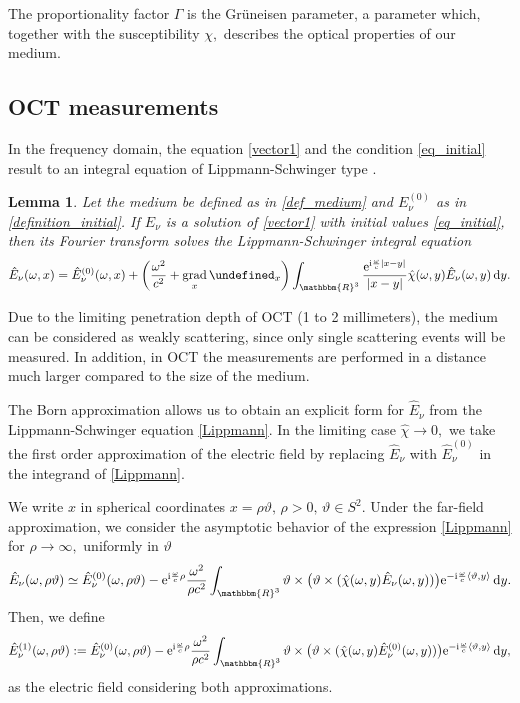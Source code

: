\documentclass[a4paper,twoside,10pt]{article}
\theoremstyle{break}
\newtheorem{lemma}{Lemma}[section]
\theoremstyle{nonumberplain}
\newcommand{\R}{\mathbbm{R}}
\newcommand{\e}{\mathrm e}
\renewcommand{\i}{\mathrm i}
\renewcommand{\d}{\,\mathrm d}
\let\div=\undefined
\DeclareMathOperator{\div}{div}
\DeclareMathOperator{\grad}{grad}
\begin{document}
The proportionality factor $\Gamma$ is the Gr\"uneisen parameter, a parameter which, together with the susceptibility $\chi,$ describes the optical properties of our medium.

\subsection{OCT measurements}

 In the frequency domain, the equation \eqref{vector1} and the condition \eqref{eq_initial} result to an integral equation of Lippmann-Schwinger type \cite{ColKre98, ElbMinSch15}. 

\begin{lemma}
Let the medium be defined as in \autoref{def_medium} and $E_\nu^{(0)}$  as in \autoref{definition_initial}. If $E_\nu$ is a solution of \eqref{vector1} with initial values \eqref{eq_initial}, then its Fourier transform solves the Lippmann-Schwinger integral equation
\begin{equation}\label{Lippmann}
\hat E_\nu (\omega ,x) = \hat E_\nu^{(0)}(\omega,x) + \left(\frac{\omega^2}{c^2}+\grad_x\div_x\right)\int_{\R^3}\frac{\e^{\i\frac\omega c|x-y|}}{ |x-y|}\hat\chi (\omega,y)\hat E_\nu (\omega,y)\d y .
\end{equation}
\end{lemma} 


Due to the limiting penetration depth of OCT (1 to 2 millimeters), the medium can be considered as weakly scattering, since only single scattering events will be measured. In addition, in OCT the measurements are performed in a distance much larger compared to the size of the medium. 

The Born approximation allows us to obtain an explicit form for $\hat E_\nu$ from the Lippmann-Schwinger equation \eqref{Lippmann}. In the limiting case $\hat\chi \rightarrow 0,$ we take the first order approximation of the electric field by replacing $\hat E_\nu$ with $\hat E_\nu^{(0)}$ in the integrand of \eqref{Lippmann}.

We write $x$ in spherical coordinates $x = \rho \vartheta , \, \rho >0, \, \vartheta \in S^2 .$ Under the far-field approximation, 
we consider the  asymptotic behavior of the expression \eqref{Lippmann} for $\rho\rightarrow \infty,$ uniformly in $\vartheta$ 
\begin{equation*}
	\hat E_\nu (\omega,\rho\vartheta) \simeq\hat E_\nu^{(0)}(\omega,\rho\vartheta)- \e^{\i\frac\omega c\rho} \frac{\omega^2}{\rho c^2}\int_{\R^3}\vartheta\times\big(\vartheta\times(\hat\chi(\omega,y)\hat E_\nu (\omega,y))\big)\e^{-\i\frac\omega c\left<\vartheta,y\right>}\d y.
\end{equation*}
Then, we define
\begin{equation}\label{eqFarField}
	\hat E_\nu^{(1)}(\omega,\rho\vartheta) := \hat E_\nu^{(0)}(\omega,\rho\vartheta)- \e^{\i\frac\omega c\rho} \frac{\omega^2}{\rho c^2}\int_{\R^3}\vartheta\times\big(\vartheta\times(\hat\chi(\omega,y)\hat E_\nu^{(0)}(\omega,y))\big)\e^{-\i\frac\omega c\left<\vartheta,y\right>}\d y,
\end{equation}
as the electric field considering both approximations.
\end{document}
